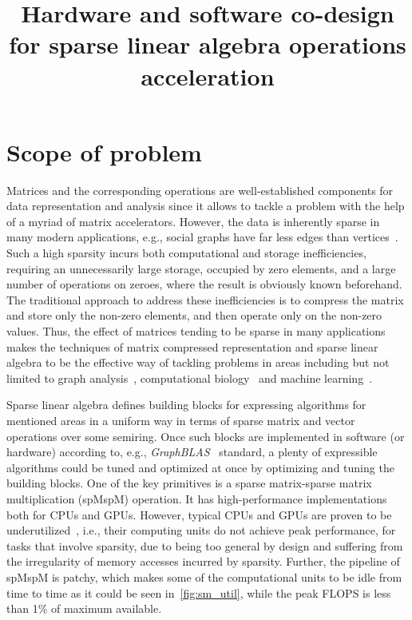 \documentclass[sigplan,review,anonymous,nonacm]{acmart}\settopmatter{printfolios=true,printccs=false,printacmref=false}
\begin{document}
\title{Hardware and software co-design for sparse linear algebra operations acceleration} 


\maketitle

\section{Scope of problem}
Matrices and the corresponding operations are well-established components for data representation and analysis since it allows to tackle a problem with the help of a myriad of matrix accelerators. However, the data is inherently sparse in many modern applications, e.g., social graphs have far less edges than vertices~\cite{leskovec2016snap}. Such a high sparsity incurs both computational and storage inefficiencies, requiring an unnecessarily large storage, occupied by zero elements, and a large number of operations on zeroes, where the result is obviously known beforehand. The traditional approach to address these inefficiencies is to compress the
matrix and store only the non-zero elements, and then operate only
on the non-zero values.
Thus, the effect of matrices tending to be sparse in many applications makes the techniques of matrix compressed representation and sparse linear algebra to be the effective way of tackling problems in areas including but not limited to graph analysis~\cite{GAILLA}, computational biology~\cite{compBio} and machine learning~\cite{Kepner_2017}.

Sparse linear algebra defines building blocks for expressing algorithms for mentioned areas in a uniform way in terms of sparse matrix and vector operations over some semiring. Once such blocks are implemented in software (or hardware) according to, e.g., \emph{GraphBLAS}~\cite{buluc2017graphblas} standard, a plenty of expressible algorithms could be tuned and optimized at once by optimizing and tuning the building blocks. One of the key primitives is a sparse matrix-sparse matrix multiplication (spMspM) operation. It has high-performance implementations both for CPUs and GPUs. However, typical CPUs and GPUs are proven to be underutilized~\cite{Florida,leskovec2016snap,Song_2016,zhang2020sparch}, i.e., their computing units do not achieve peak performance, for tasks that involve sparsity, due to being too general by design and suffering from the irregularity of memory accesses incurred by sparsity. Further, the pipeline of spMspM is patchy, which makes some of the computational units to be idle from time to time as it could be seen in~\ref{fig:sm_util}, while the peak FLOPS is less than 1\% of maximum available.
\end{document}
